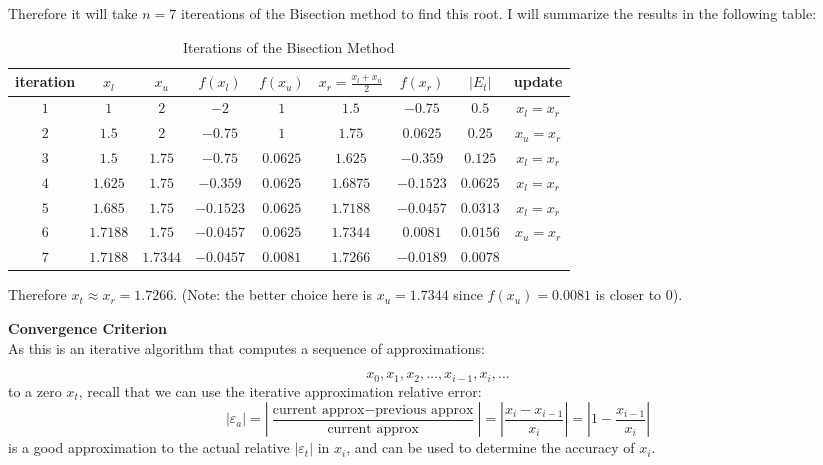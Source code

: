 \documentclass [titlepage,12pt,letter] {article}
\begin{document}
\noindent
Therefore it will take $n=7$ itereations of the Bisection method to find this root. I will summarize the results in the following table:

\begin{table}[h]
\begin{center}
\begin{tabular}{c|c|c|c|c|c|c|c|c}
iteration & $x_{l}$ & $x_{u}$ & $f(x_{l})$ & $f(x_{u})$ & $x_{r}=\frac{x_{l}+x_{u}}{2}$ & $f(x_{r})$ & $|E_{t}|$ & update \\
\hline
$1$ & $1$ & $2$ & $-2$ & $1$ & $1.5$ & $-0.75$ & $0.5$ & $x_{l}=x_{r}$\\ 
$2$ & $1.5$ & $2$ & $-0.75$ & $1$ & $1.75$ & $0.0625$ & $0.25$ & $x_{u}=x_{r}$\\ 
$3$ & $1.5$ & $1.75$ & $-0.75$ & $0.0625$ & $1.625$ & $-0.359$ & $0.125$ & $x_{l}=x_{r}$\\ 
$4$ & $1.625$ & $1.75$ & $-0.359$ & $0.0625$ & $1.6875$ & $-0.1523$ & $0.0625$ & $x_{l}=x_{r}$\\ 
$5$ & $1.685$ & $1.75$ & $-0.1523$ & $0.0625$ & $1.7188$ & $-0.0457$ & $0.0313$ & $x_{l}=x_{r}$\\ 
$6$ & $1.7188$ & $1.75$ & $-0.0457$ & $0.0625$ & $1.7344$ & $0.0081$ & $0.0156$ & $x_{u}=x_{r}$\\ 
$7$ & $1.7188$ & $1.7344$ & $-0.0457$ & $0.0081$ & $1.7266$ & $-0.0189$ & $0.0078$ & \\ 

\end{tabular}
\caption{Iterations of the Bisection Method} 
\end{center}
\end{table}

\noindent
Therefore $x_{t} \approx x_{r} = 1.7266$. (Note: the better choice here is $x_{u}=1.7344$ since $f(x_{u})=0.0081$ is closer to $0$).

{\bf Convergence Criterion} 
\\ 
As this is an iterative algorithm that computes a sequence of approximations: 

\[
x_0, x_1, x_2, \dots, x_{i-1}, x_i, \dots 
\] 
\noindent 
to a zero $x_t$, recall that we can use the iterative approximation relative 
error: 
\[
|\varepsilon_{a}| = \left| \frac{\mbox{current approx} - \mbox{previous approx}}{\mbox{current approx}} \right| = \left| \frac{x_i - x_{i-1}}{x_i}\right| = \left | 1 - \frac{x_{i-1}}{x_i} \right| 
\]
\noindent 
is a good approximation to the actual relative $|\varepsilon_t|$ in $x_i$, and can be used to determine the accuracy of $x_i$. 
\end{document}

